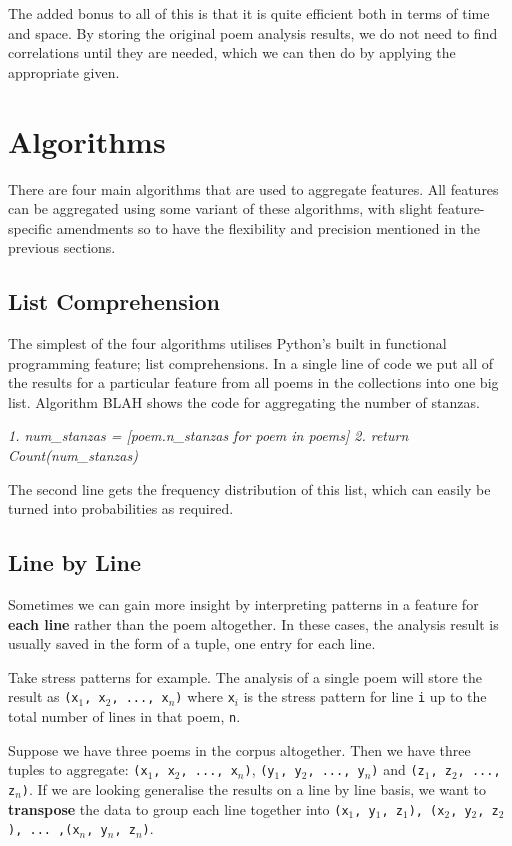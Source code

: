 The added bonus to all of this is that it is quite efficient both in terms of time and space. By storing the original poem analysis results, we do not need to find correlations until they are needed, which we can then do by applying the appropriate given.


\section{Algorithms}

There are four main algorithms that are used to aggregate features. All features can be aggregated using some variant of these algorithms, with slight feature-specific amendments so to have the flexibility and precision mentioned in the previous sections.

\subsection{List Comprehension}
\label{sec:listcomp}

The simplest of the four algorithms utilises Python's built in functional programming feature; list comprehensions. In a single line of code we put all of the results for a particular feature from all poems in the collections into one big list. Algorithm BLAH shows the code for aggregating the number of stanzas.

\textit{
1. num\_stanzas = [poem.n\_stanzas for poem in poems]
2. return Count(num\_stanzas)
}

The second line gets the frequency distribution of this list, which can easily be turned into probabilities as required.


\subsection{Line by Line}

Sometimes we can gain more insight by interpreting patterns in a feature for \textbf{each line} rather than the poem altogether. In these cases, the analysis result is usually saved in the form of a tuple, one entry for each line.

Take stress patterns for example. The analysis of a single poem will store the result as \texttt{(x$_1$, x$_2$, ..., x$_n$)} where \texttt{x$_i$} is the stress pattern for line \texttt{i} up to the total number of lines in that poem, \texttt{n}.

Suppose we have three poems in the corpus altogether. Then we have three tuples to aggregate: \texttt{(x$_1$, x$_2$, ..., x$_n$)}, \texttt{(y$_1$, y$_2$, ..., y$_n$)} and \texttt{(z$_1$, z$_2$, ..., z$_n$)}. If we are looking generalise the results on a line by line basis, we want to \textbf{transpose} the data to group each line together into \texttt{(x$_1$, y$_1$, z$_1$), (x$_2$, y$_2$, z$_2$), ... ,(x$_n$, y$_n$, z$_n$)}.

